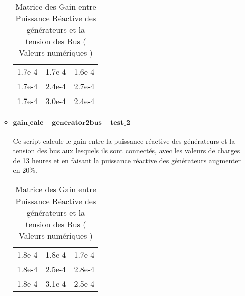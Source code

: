 \begin{itemize}
\begin{itemize}
\begin{table}[H]
	\captionsetup{justification=centering,margin=2cm}
	\caption{Matrice des Gain entre Puissance Réactive des générateurs et la tension des Bus ( Valeurs numériques )}
	\centering
	\begin{tabular}{ccc}
		1.7e-4&1.7e-4&1.6e-4\\
		1.7e-4&2.4e-4&2.7e-4\\
		1.7e-4&3.0e-4&2.4e-4\\
	\end{tabular}
	
\end{table}

\item $\mathbf{gain\_calc-generator2bus-test\_2}$\\
\\Ce script calcule le gain entre la puissance réactive des générateurs et la tension des bus aux lesquels ils sont connectés, avec les valeurs de charges de 13 heures et en faisant la puissance réactive des générateurs augmenter en 20\%.

\begin{table}[H]
	\captionsetup{justification=centering,margin=2cm}
	\caption{Matrice des Gain entre Puissance Réactive des générateurs et la tension des Bus ( Valeurs numériques )}
	\centering
	\begin{tabular}{ccc}
		
		1.8e-4&1.8e-4&1.7e-4\\
		
		1.8e-4&2.5e-4&2.8e-4\\
		
		1.8e-4&3.1e-4&2.5e-4\\
	\end{tabular}
\end{table}


\end{itemize}
\end{itemize}
